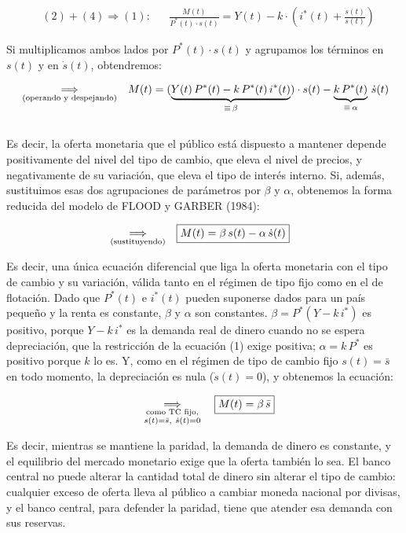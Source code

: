 \documentclass[10pt,a4paper]{article}
\begin{document}
$$\begin{aligned}
  &(2)+(4)\Rightarrow(1):&&\frac{M(t)}{P^*(t)\cdot s(t)}=Y(t)-k\cdot \left(i^*(t)+\frac{\dot s(t)}{s(t)}\right)
\end{aligned}$$

Si multiplicamos ambos lados por $P^*(t)\cdot s(t)$ y agrupamos los términos en $s(t)$ y en $\dot s(t)$, obtendremos:

$$\begin{aligned}
  &\underset{\text{\scriptsize (operando y despejando)}}{\Longrightarrow}&&M(t)=(\underbrace{Y(t)\, P^*(t)-k\, P^*(t)\,i^*(t)}_{\equiv\,\beta})\cdot s(t)-\underbrace{k\,P^*(t)}_{\equiv\,\alpha}\,\dot s(t)\\[1em]
\end{aligned}$$

Es decir, la oferta monetaria que el público está dispuesto a mantener depende positivamente del nivel del tipo de cambio, que eleva el nivel de precios, y negativamente de su variación, que eleva el tipo de interés interno. Si, además, sustituimos esas dos agrupaciones de parámetros por $\beta$ y $\alpha$, obtenemos la forma reducida del modelo de FLOOD y GARBER (1984):

$$\begin{aligned}
  &\underset{\text{\scriptsize (sustituyendo)}}{\Longrightarrow}&&\boxed{M(t)=\beta\,s(t)-\alpha\,\dot s(t)}
\end{aligned}$$

Es decir, una única ecuación diferencial que liga la oferta monetaria con el tipo de cambio y su variación, válida tanto en el régimen de tipo fijo como en el de flotación. Dado que $P^*(t)$ e $i^*(t)$ pueden suponerse dados para un país pequeño y la renta es constante, $\beta$ y $\alpha$ son constantes. $\beta=P^*(Y-k\,i^*)$ es positivo, porque $Y-k\,i^*$ es la demanda real de dinero cuando no se espera depreciación, que la restricción de la ecuación (1) exige positiva; $\alpha=k\,P^*$ es positivo porque $k$ lo es. Y, como en el régimen de tipo de cambio fijo $s(t)=\bar s$ en todo momento, la depreciación es nula ($\dot s(t)=0$), y obtenemos la ecuación:

$$\begin{aligned}
  \quad\underset{\substack{\text{\scriptsize como TC fijo,}\\ s(t)=\bar s,\ \dot s(t)=0}}{\Longrightarrow}\quad\boxed{M(t)=\beta\,\bar s}
\end{aligned}$$

Es decir, mientras se mantiene la paridad, la demanda de dinero es constante, y el equilibrio del mercado monetario exige que la oferta también lo sea. El banco central no puede alterar la cantidad total de dinero sin alterar el tipo de cambio: cualquier exceso de oferta lleva al público a cambiar moneda nacional por divisas, y el banco central, para defender la paridad, tiene que atender esa demanda con sus reservas.
\end{document}
